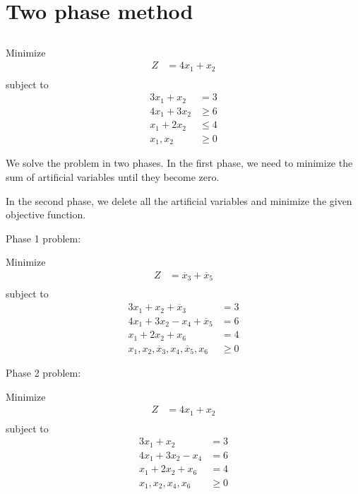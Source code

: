\documentclass[12pt]{article}
\begin{document}
\section{Two phase method}
\label{sec-2}
\subsection{}

Minimize
\begin{align*}
Z&= 4x_1+x_2  \\
\end{align*}
subject to
\begin{align*}
3x_1+x_2&= 3  \\
4x_1+3x_2&\ge 6\\
x_1+2x_2&\le 4\\
x_1,x_2&\ge 0
\end{align*}


We solve the problem in two phases. In the first phase, we need to minimize the sum of artificial variables until they become zero.

In the second phase, we delete all the artificial variables and minimize the given objective function.

Phase 1 problem:

Minimize
\begin{align*}
Z                                             & = \overline{x}_3+\overline{x}_5 \\
\end{align*}
subject to
\begin{align*}
3x_1+x_2+\overline{x}_3                       & = 3                             \\
4x_1+3x_2-x_4+\overline{x}_5                  & = 6                             \\
x_1+2x_2+x_6                                  & = 4                             \\
x_1,x_2,\overline{x}_3,x_4,\overline{x}_5,x_6 & \ge 0
\end{align*}

Phase 2 problem:

Minimize
\begin{align*}
Z               & = 4x_1+x_2 \\
\end{align*}
subject to
\begin{align*}
3x_1+x_2        & = 3        \\
4x_1+3x_2-x_4   & = 6        \\
x_1+2x_2+x_6    & = 4        \\
x_1,x_2,x_4,x_6 & \ge 0
\end{align*}
\end{document}
